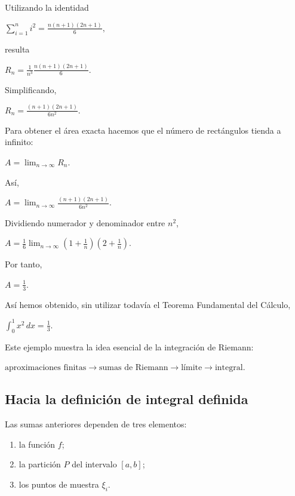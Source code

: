 \documentclass[12pt]{article}
\begin{document}
Utilizando la identidad

$
\sum_{i=1}^{n}i^2
=
\frac{n(n+1)(2n+1)}{6},
$

resulta

$
R_n
=
\frac{1}{n^3}
\frac{n(n+1)(2n+1)}{6}.
$

Simplificando,

$
R_n
=
\frac{(n+1)(2n+1)}{6n^2}.
$

Para obtener el área exacta hacemos que el número de rectángulos tienda
a infinito:

$
A
=
\lim_{n\to\infty}R_n.
$

Así,

$
A
=
\lim_{n\to\infty}
\frac{(n+1)(2n+1)}{6n^2}.
$

Dividiendo numerador y denominador entre $n^2$,

$
A
=
\frac{1}{6}
\lim_{n\to\infty}
\left(1+\frac{1}{n}\right)
\left(2+\frac{1}{n}\right).
$

Por tanto,

$
\boxed{
A=\frac{1}{3}.
}
$

Así hemos obtenido, sin utilizar todavía el Teorema Fundamental del
Cálculo,

$
\int_0^1x^2\,dx=\frac{1}{3}.
$

Este ejemplo muestra la idea esencial de la integración de Riemann:

$
\boxed{
\text{aproximaciones finitas}
\longrightarrow
\text{sumas de Riemann}
\longrightarrow
\text{límite}
\longrightarrow
\text{integral}.
}
$

\subsection*{Hacia la definición de integral definida}

Las sumas anteriores dependen de tres elementos:

\begin{enumerate}

    \item la función $f$;

    \item la partición $P$ del intervalo $[a,b]$;

    \item los puntos de muestra $\xi_i$.

\end{enumerate}
\end{document}
